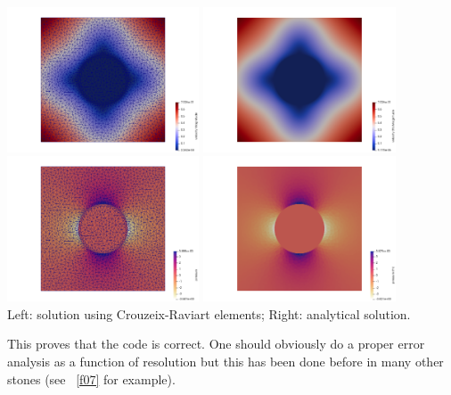 \begin{center}
\includegraphics[width=5.7cm]{python_codes/fieldstone_142/results/case0/vel}
\includegraphics[width=5.7cm]{python_codes/fieldstone_142/results/case0/vel_th}\\
\includegraphics[width=5.7cm]{python_codes/fieldstone_142/results/case0/press}
\includegraphics[width=5.7cm]{python_codes/fieldstone_142/results/case0/press_th}\\
{\captionfont Left: solution using Crouzeix-Raviart elements; Right: analytical solution.}
\end{center}

This proves that the code is correct. One should obviously do a proper error analysis as a function 
of resolution but this has been done before in many other stones (see \stone~\ref{f07} for example). 

